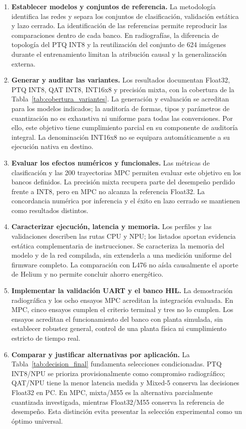 \begin{enumerate}
\item \textbf{Establecer modelos y conjuntos de referencia.} La metodología identifica las redes y separa los conjuntos de clasificación, validación estática y lazo cerrado. La identificación de las referencias permite reproducir las comparaciones dentro de cada banco. En radiografías, la diferencia de topología del PTQ INT8 y la reutilización del conjunto de 624 imágenes durante el entrenamiento limitan la atribución causal y la generalización externa.
\item \textbf{Generar y auditar las variantes.} Los resultados documentan Float32, PTQ INT8, QAT INT8, INT16x8 y precisión mixta, con la cobertura de la Tabla~\ref{tab:cobertura_variantes}. La generación y evaluación se acreditan para los modelos indicados; la auditoría de formas, tipos y parámetros de cuantización no es exhaustiva ni uniforme para todas las conversiones. Por ello, este objetivo tiene cumplimiento parcial en su componente de auditoría integral. La denominación INT16x8 no se equipara automáticamente a su ejecución nativa en destino.
\item \textbf{Evaluar los efectos numéricos y funcionales.} Las métricas de clasificación y las 200 trayectorias MPC permiten evaluar este objetivo en los bancos definidos. La precisión mixta recupera parte del desempeño perdido frente a INT8, pero en MPC no alcanza la referencia Float32. La concordancia numérica por inferencia y el éxito en lazo cerrado se mantienen como resultados distintos.
\item \textbf{Caracterizar ejecución, latencia y memoria.} Los perfiles y las validaciones describen las rutas CPU y NPU; los listados aportan evidencia estática complementaria de instrucciones. Se caracteriza la memoria del modelo y de la red compilada, sin extenderla a una medición uniforme del firmware completo. La comparación con L476 no aísla causalmente el aporte de Helium y no permite concluir ahorro energético.
\item \textbf{Implementar la validación UART y el banco HIL.} La demostración radiográfica y los ocho ensayos MPC acreditan la integración evaluada. En MPC, cinco ensayos cumplen el criterio terminal y tres no lo cumplen. Los ensayos acreditan el funcionamiento del banco con planta simulada, sin establecer robustez general, control de una planta física ni cumplimiento estricto de tiempo real.
\item \textbf{Comparar y justificar alternativas por aplicación.} La Tabla~\ref{tab:decision_final} fundamenta selecciones condicionadas. PTQ INT8/NPU se prioriza provisionalmente como compromiso radiográfico; QAT/NPU tiene la menor latencia medida y Mixed-5 conserva las decisiones Float32 en PC. En MPC, mixta/M55 es la alternativa parcialmente cuantizada investigada, mientras Float32/M55 conserva la referencia de desempeño. Esta distinción evita presentar la selección experimental como un óptimo universal.
\end{enumerate}


